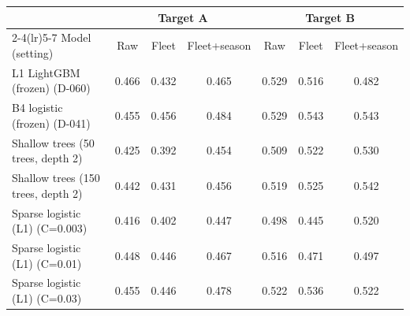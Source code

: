 \begin{tabular}{@{}lcccccc@{}}
\toprule
 & \multicolumn{3}{c}{Target A} & \multicolumn{3}{c}{Target B} \\
\cmidrule(lr){2-4}\cmidrule(lr){5-7}
Model (setting) & Raw & Fleet & Fleet+season & Raw & Fleet & Fleet+season \\
\midrule
L1 LightGBM (frozen) (D-060) & 0.466 & 0.432 & 0.465 & 0.529 & 0.516 & 0.482 \\
B4 logistic (frozen) (D-041) & 0.455 & 0.456 & 0.484 & 0.529 & 0.543 & 0.543 \\
Shallow trees (50 trees, depth 2) & 0.425 & 0.392 & 0.454 & 0.509 & 0.522 & 0.530 \\
Shallow trees (150 trees, depth 2) & 0.442 & 0.431 & 0.456 & 0.519 & 0.525 & 0.542 \\
Sparse logistic (L1) (C=0.003) & 0.416 & 0.402 & 0.447 & 0.498 & 0.445 & 0.520 \\
Sparse logistic (L1) (C=0.01) & 0.448 & 0.446 & 0.467 & 0.516 & 0.471 & 0.497 \\
Sparse logistic (L1) (C=0.03) & 0.455 & 0.446 & 0.478 & 0.522 & 0.536 & 0.522 \\
\bottomrule
\end{tabular}
